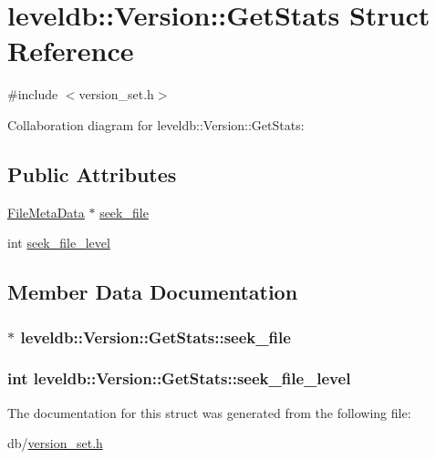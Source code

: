 \hypertarget{structleveldb_1_1_version_1_1_get_stats}{\section{leveldb\-:\-:Version\-:\-:Get\-Stats Struct Reference}
\label{structleveldb_1_1_version_1_1_get_stats}
}


{\ttfamily \#include $<$version\-\_\-set.\-h$>$}



Collaboration diagram for leveldb\-:\-:Version\-:\-:Get\-Stats\-:
\subsection*{Public Attributes}
\begin{DoxyCompactItemize}
\item 
\hyperlink{structleveldb_1_1_file_meta_data}{File\-Meta\-Data} $\ast$ \hyperlink{structleveldb_1_1_version_1_1_get_stats_a8c677e9a2d5bc48a5bcc40e07dd2cca7}{seek\-\_\-file}
\item 
int \hyperlink{structleveldb_1_1_version_1_1_get_stats_a6cd952d5850faf00c7d45f79973a76d4}{seek\-\_\-file\-\_\-level}
\end{DoxyCompactItemize}


\subsection{Member Data Documentation}
\hypertarget{structleveldb_1_1_version_1_1_get_stats_a8c677e9a2d5bc48a5bcc40e07dd2cca7}{
\subsubsection[{seek\-\_\-file}]{$\ast$ leveldb\-::\-Version\-::\-Get\-Stats\-::seek\-\_\-file}}\label{structleveldb_1_1_version_1_1_get_stats_a8c677e9a2d5bc48a5bcc40e07dd2cca7}
\hypertarget{structleveldb_1_1_version_1_1_get_stats_a6cd952d5850faf00c7d45f79973a76d4}{
\subsubsection[{seek\-\_\-file\-\_\-level}]{\setlength{\rightskip}{0pt plus 5cm}int leveldb\-::\-Version\-::\-Get\-Stats\-::seek\-\_\-file\-\_\-level}}\label{structleveldb_1_1_version_1_1_get_stats_a6cd952d5850faf00c7d45f79973a76d4}


The documentation for this struct was generated from the following file\-:\begin{DoxyCompactItemize}
\item 
db/\hyperlink{version__set_8h}{version\-\_\-set.\-h}\end{DoxyCompactItemize}
